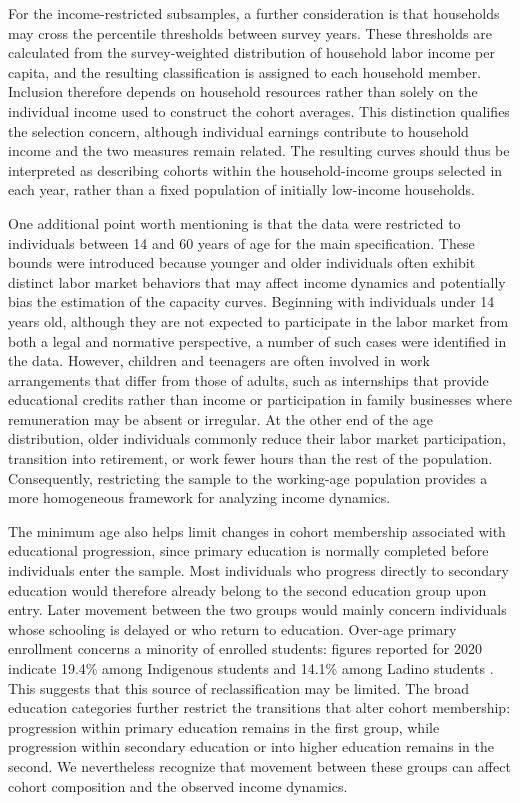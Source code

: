 \documentclass{article}
\begin{document}
For the income-restricted subsamples, a further consideration is that households may cross the percentile thresholds between survey years. These thresholds are calculated from the survey-weighted distribution of household labor income per capita, and the resulting classification is assigned to each household member. Inclusion therefore depends on household resources rather than solely on the individual income used to construct the cohort averages. This distinction qualifies the selection concern, although individual earnings contribute to household income and the two measures remain related. The resulting curves should thus be interpreted as describing cohorts within the household-income groups selected in each year, rather than a fixed population of initially low-income households.

One additional point worth mentioning is that the data were restricted to individuals between 14 and 60 years of age for the main specification. These bounds were introduced because younger and older individuals often exhibit distinct labor market behaviors that may affect income dynamics and potentially bias the estimation of the capacity curves. Beginning with individuals under 14 years old, although they are not expected to participate in the labor market from both a legal and normative perspective, a number of such cases were identified in the data. However, children and teenagers are often involved in work arrangements that differ from those of adults, such as internships that provide educational credits rather than income or participation in family businesses where remuneration may be absent or irregular. At the other end of the age distribution, older individuals commonly reduce their labor market participation, transition into retirement, or work fewer hours than the rest of the population. Consequently, restricting the sample to the working-age population provides a more homogeneous framework for analyzing income dynamics.

The minimum age also helps limit changes in cohort membership associated with educational progression, since primary education is normally completed before individuals enter the sample. Most individuals who progress directly to secondary education would therefore already belong to the second education group upon entry. Later movement between the two groups would mainly concern individuals whose schooling is delayed or who return to education. Over-age primary enrollment concerns a minority of enrolled students: figures reported for 2020 indicate 19.4\% among Indigenous students and 14.1\% among Ladino students \parencite[Table VII.6, p.~208]{huenchuan2024inequality}. This suggests that this source of reclassification may be limited. The broad education categories further restrict the transitions that alter cohort membership: progression within primary education remains in the first group, while progression within secondary education or into higher education remains in the second. We nevertheless recognize that movement between these groups can affect cohort composition and the observed income dynamics.
\end{document}
